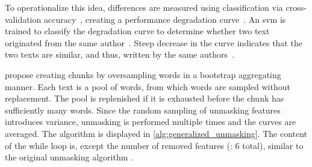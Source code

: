 To operationalize this idea, differences are measured using classification via cross-validation accuracy~\citep{koppel_authorship_2011,bevendorff_generalizing_2019,bevendorff_divergence_based_2020,potthast_stylometric_2018,koppel_authorship_2004}, 
creating a performance degradation curve~\citep{tyo_state_2022,koppel_authorship_2004}.
An \ac{svm} is trained to classify the degradation curve to determine whether two text originated from the same author~\citep{tyo_state_2022,bevendorff_generalizing_2019,koppel_authorship_2004}.
Steep decrease in the curve indicates that the two texts are similar, and thus, written by the same authors~\citep{potthast_stylometric_2018,koppel_authorship_2004}.

\citet{bevendorff_generalizing_2019,bevendorff_divergence_based_2020} propose creating chunks by oversampling words in a bootstrap aggregating manner. 
Each text is a pool of words, from which words are sampled without replacement.
The pool is replenished if it is exhausted before the chunk has sufficiently many words.
Since the random sampling of unmasking features introduces variance, unmasking is performed multiple times and the curves are averaged.
The algorithm is displayed in \autoref{alg:generalized_unmasking}.
The content of the while loop is, except the number of removed features (\citep{koppel_authorship_2004}: 6 total), similar to the original unmasking algorithm \citep{koppel_authorship_2004}.


